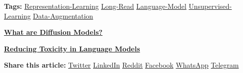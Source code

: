 \documentclass[12pt]{article}
\begin{document}
\vspace{2em}
\noindent
\textbf{Tags:}
\href{https://lilianweng.github.io/tags/representation-learning/}{Representation-Learning} \quad
\href{https://lilianweng.github.io/tags/long-read/}{Long-Read} \quad
\href{https://lilianweng.github.io/tags/language-model/}{Language-Model} \quad
\href{https://lilianweng.github.io/tags/unsupervised-learning/}{Unsupervised-Learning} \quad
\href{https://lilianweng.github.io/tags/data-augmentation/}{Data-Augmentation}

\vspace{2em}
\noindent
\begin{minipage}{0.48\textwidth}
    \raggedright
    \textbf{\href{https://lilianweng.github.io/posts/2021-07-11-diffusion-models/}{\textlangle\quad What are Diffusion Models?}}
\end{minipage}
\hfill
\begin{minipage}{0.48\textwidth}
    \raggedleft
    \textbf{\href{https://lilianweng.github.io/posts/2021-03-21-lm-toxicity/}{Reducing Toxicity in Language Models \quad\textrangle}}
\end{minipage}
\vspace{2em}

\begin{center}
  \vspace{1em}
  \textbf{Share this article:}
  \href{https://twitter.com/intent/tweet/?text=Contrastive%20Representation%20Learning&url=https%3a%2f%2flilianweng.github.io%2fposts%2f2021-05-31-contrastive%2f&hashtags=representation-learning%2clong-read%2clanguage-model%2cunsupervised-learning%2cdata-augmentation}{Twitter} \textbar{}
  \href{https://www.linkedin.com/shareArticle?mini=true&url=https%3a%2f%2flilianweng.github.io%2fposts%2f2021-05-31-contrastive%2f&title=Contrastive%20Representation%20Learning&summary=Contrastive%20Representation%20Learning&source=https%3a%2f%2flilianweng.github.io%2fposts%2f2021-05-31-contrastive%2f}{LinkedIn} \textbar{}
  \href{https://reddit.com/submit?url=https%3a%2f%2flilianweng.github.io%2fposts%2f2021-05-31-contrastive%2f&title=Contrastive%20Representation%20Learning}{Reddit} \textbar{}
  \href{https://facebook.com/sharer/sharer.php?u=https%3a%2f%2flilianweng.github.io%2fposts%2f2021-05-31-contrastive%2f}{Facebook} \textbar{}
  \href{https://api.whatsapp.com/send?text=Contrastive%20Representation%20Learning%20-%20https%3a%2f%2flilianweng.github.io%2fposts%2f2021-05-31-contrastive%2f}{WhatsApp} \textbar{}
  \href{https://t.me/share/url?url=https%3a%2f%2flilianweng.github.io%2fposts%2f2021-05-31-contrastive%2f&text=Contrastive%20Representation%20Learning}{Telegram}
\end{center}
\end{document}

